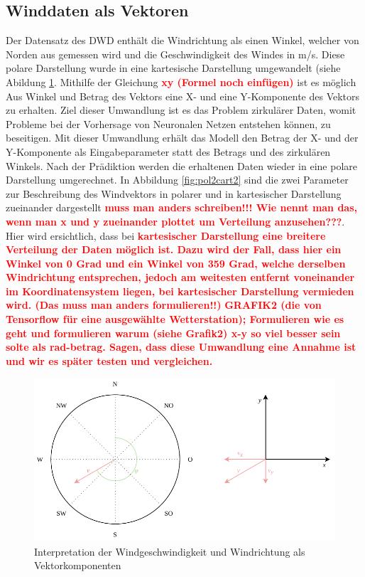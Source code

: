 \documentclass[
12pt, %
toc=listofnumbered, %
toc=chapterentrydotfill, %
numbers=noenddot, %
captions=tableheading, %
]{scrreprt}
\let\Oldsubsection\subsection
\renewcommand{\subsection}{\FloatBarrier\Oldsubsection}
\newcommand{\highlight}[1]{\textbf{\textcolor{red}{#1}}}
\begin{document}
\subsection{Winddaten als Vektoren}
Der Datensatz des DWD enthält die Windrichtung als einen Winkel, welcher von Norden aus gemessen wird und die Geschwindigkeit des Windes in m/s. Diese polare Darstellung wurde in eine kartesische Darstellung umgewandelt (siehe Abildung \ref{fig:pol2cart}. Mithilfe der Gleichung \highlight{xy (Formel noch einfügen)} ist es möglich Aus Winkel und Betrag des Vektors eine X- und eine Y-Komponente des Vektors zu erhalten. Ziel dieser Umwandlung ist es das Problem zirkulärer Daten, womit Probleme bei der Vorhersage von Neuronalen Netzen entstehen können, zu beseitigen. Mit dieser Umwandlung erhält das Modell den Betrag der X- und der Y-Komponente als Eingabeparameter statt des Betrags und des zirkulären Winkels. Nach der Prädiktion werden die erhaltenen Daten wieder in eine polare Darstellung umgerechnet. In Abbildung \ref{fig:pol2cart2} sind die zwei Parameter zur Beschreibung des Windvektors in polarer und in kartesischer Darstellung zueinander dargestellt \highlight{muss man anders schreiben!!! Wie nennt man das, wenn man x und y zueinander plottet um Verteilung anzusehen???}. Hier wird ersichtlich, dass bei \highlight{kartesischer Darstellung eine breitere Verteilung der Daten möglich ist. Dazu wird der Fall, dass hier ein Winkel von 0 Grad und ein Winkel von 359 Grad, welche derselben Windrichtung entsprechen, jedoch am weitesten entfernt voneinander im Koordinatensystem liegen, bei kartesischer Darstellung vermieden wird. (Das muss man anders formulieren!!)} 
\highlight{GRAFIK2 (die von Tensorflow für eine ausgewählte Wetterstation); 
Formulieren wie es geht und formulieren warum (siehe Grafik2) x-y so viel besser sein solte als rad-betrag. Sagen, dass diese Umwandlung eine Annahme ist und wir es später testen und vergleichen.}

\begin{figure}[tph]
	\begin{center}
		\includegraphics[scale = 1]{./images/pol2cart.pdf}
		\caption{Interpretation der Windgeschwindigkeit und Windrichtung als Vektorkomponenten}
		\label{fig:pol2cart}
	\end{center}
\end{figure}
\end{document}
